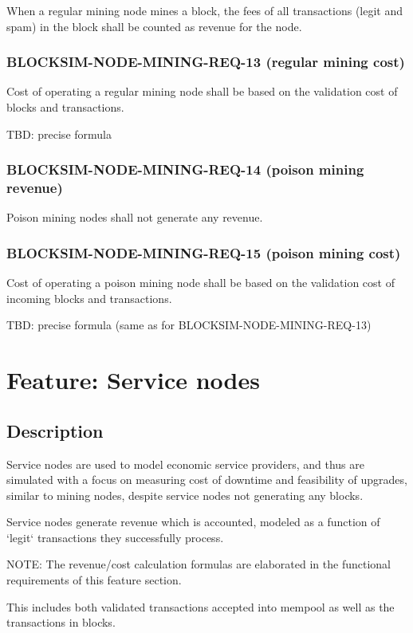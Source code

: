 \documentclass{scrreprt}
\begin{document}
When a regular mining node mines a block, the fees of all transactions
(legit and spam) in the block shall be counted as revenue for the node.

\subsubsection{BLOCKSIM-NODE-MINING-REQ-13 (regular mining cost)}

Cost of operating a regular mining node shall be based on the validation
cost of blocks and transactions.

TBD: precise formula

\subsubsection{BLOCKSIM-NODE-MINING-REQ-14 (poison mining revenue)}

Poison mining nodes shall not generate any revenue.

\subsubsection{BLOCKSIM-NODE-MINING-REQ-15 (poison mining cost)}

Cost of operating a poison mining node shall be based on the validation
cost of incoming blocks and transactions.

TBD: precise formula (same as for BLOCKSIM-NODE-MINING-REQ-13)


\section{Feature: Service nodes}

\subsection{Description}

Service nodes are used to model economic service providers, and thus
are simulated with a focus on measuring cost of downtime and feasibility
of upgrades, similar to mining nodes, despite service nodes not generating
any blocks.

Service nodes generate revenue which is accounted, modeled as a function of
`legit` transactions they successfully process.

NOTE: The revenue/cost calculation formulas are elaborated in the functional
requirements of this feature section.

This includes both validated transactions accepted into mempool as well as
the transactions in blocks.
\end{document}
